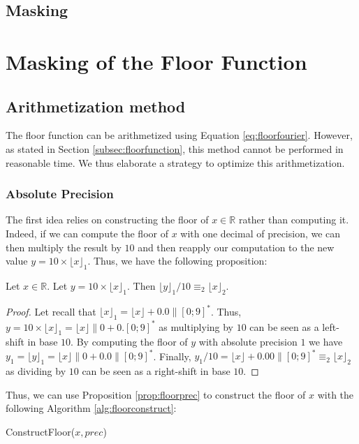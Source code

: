 \documentclass[runningheads]{llncs}
\begin{document}
\subsection{Masking}

\section{Masking of the Floor Function}\label{sec:maskfloor}
\subsection{Arithmetization method}
The floor function can be arithmetized using Equation \ref{eq:floorfourier}. However, as stated in Section \ref{subsec:floorfunction}, this method cannot be performed in reasonable time. We thus elaborate a strategy to optimize this arithmetization.

\subsubsection{Absolute Precision} 
The first idea relies on constructing the floor of $x\in\mathbb{R}$ rather than computing it. Indeed, if we can compute the floor of $x$ with one decimal of precision, we can then multiply the result by $10$ and then reapply our computation to the new value $y=10\times \lfloor x\rfloor_1$. Thus, we have the following proposition:
\begin{proposition}\label{prop:floorprec}
  Let $x\in\mathbb{R}$. Let $y = 10\times\lfloor x\rfloor_1$. Then $\lfloor y \rfloor_1 /10 \equiv_2 \lfloor x \rfloor_2$.
\end{proposition}
\begin{proof}
  Let recall that $\lfloor x \rfloor_1 = \lfloor x \rfloor + 0.0 \|[0;9]^*$. Thus, $y=10\times\lfloor x \rfloor_1=\lfloor x\rfloor\|0+0.[0;9]^*$ as multiplying by $10$ can be seen as a left-shift in base $10$. By computing the floor of $y$ with absolute precision $1$ we have $y_1=\lfloor y \rfloor_1 = \lfloor x \rfloor\|0 + 0.0\|[0;9]^*$. Finally, $ y_1/10 = \lfloor x \rfloor + 0.00\|[0;9]^*\equiv_2 \lfloor x \rfloor_2$ as dividing by $10$ can be seen as a right-shift in base $10$.  
\end{proof}
Thus, we can use Proposition \ref{prop:floorprec} to construct the floor of $x$ with the following Algorithm \ref{alg:floorconstruct}:

\begin{algorithm}[H]
  \caption{ConstructFloor($x,prec$)}
  \label{alg:floorconstruct}
\end{algorithm}
\end{document}
